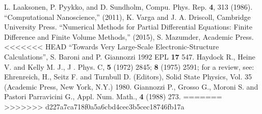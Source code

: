 \documentclass[11pt,a4paper]{article}
\begin{document}
\begin{thebibliography}{1}
 L. Laaksonen, P. Pyykko, and D. Sundholm, Compu. Phys. Rep. \textbf{4}, 313 (1986).
 ``Computational Nanoscience,'' (2011), K. Varga and J. A. Driscoll, Cambridge University Press.
 ``Numerical Methods for Partial Differential Equations: Finite Difference and Finite Volume Methods,'' (2015), S. Mazumder, Academic Press.
<<<<<<< HEAD
 ``Towards Very Large-Scale Electronic-Structure Calculations'', S. Baroni and P. Giannozzi 1992 EPL \textbf{17} 547.
 Haydock R., Heine V. and Kelly M. J., J . Phys. C, \textbf{5} (1972) 2845; \textbf{8} (1975) 2591; for a review, see: Ehrenreich, H., Seitz F. and Turnbull D. (Editors), Solid State Physics, Vol. 35 (Academic Press, New York, N.Y.) 1980.
  Giannozzi P., Grosso G., Moroni S. and Pastori Parravicini G., Appl. Num. Math., \textbf{4} (1988) 273.
=======
>>>>>>> d227a7ca718f0a5a6cbd4cec3b5cec18746fb17a
\end{thebibliography}
\end{document}
